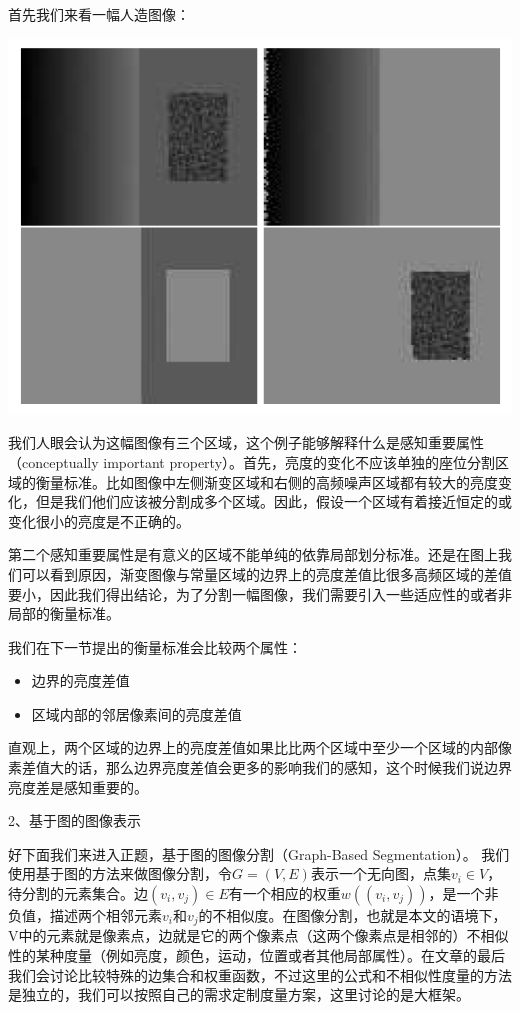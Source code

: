 首先我们来看一幅人造图像：

\includegraphics[width=15.00cm]{imgs/ch2/man_made}

我们人眼会认为这幅图像有三个区域，这个例子能够解释什么是感知重要属性（conceptually important property）。首先，亮度的变化不应该单独的座位分割区域的衡量标准。比如图像中左侧渐变区域和右侧的高频噪声区域都有较大的亮度变化，但是我们他们应该被分割成多个区域。因此，假设一个区域有着接近恒定的或变化很小的亮度是不正确的。

第二个感知重要属性是有意义的区域不能单纯的依靠局部划分标准。还是在图上我们可以看到原因，渐变图像与常量区域的边界上的亮度差值比很多高频区域的差值要小，因此我们得出结论，为了分割一幅图像，我们需要引入一些适应性的或者非局部的衡量标准。

我们在下一节提出的衡量标准会比较两个属性：
\begin{itemize}
\item 边界的亮度差值
\item 区域内部的邻居像素间的亮度差值
\end{itemize}
直观上，两个区域的边界上的亮度差值如果比比两个区域中至少一个区域的内部像素差值大的话，那么边界亮度差值会更多的影响我们的感知，这个时候我们说边界亮度差是感知重要的。

2、基于图的图像表示

好下面我们来进入正题，基于图的图像分割（Graph-Based Segmentation）。
我们使用基于图的方法来做图像分割，令\(G=(V,E)\)表示一个无向图，点集\(v_i \in V\)，待分割的元素集合。边\((v_i,v_j) \in E\)有一个相应的权重\(w((v_i,v_j))\)，是一个非负值，描述两个相邻元素\(v_i\)和\(v_j\)的不相似度。在图像分割，也就是本文的语境下，V中的元素就是像素点，边就是它的两个像素点（这两个像素点是相邻的）不相似性的某种度量（例如亮度，颜色，运动，位置或者其他局部属性）。在文章的最后我们会讨论比较特殊的边集合和权重函数，不过这里的公式和不相似性度量的方法是独立的，我们可以按照自己的需求定制度量方案，这里讨论的是大框架。


